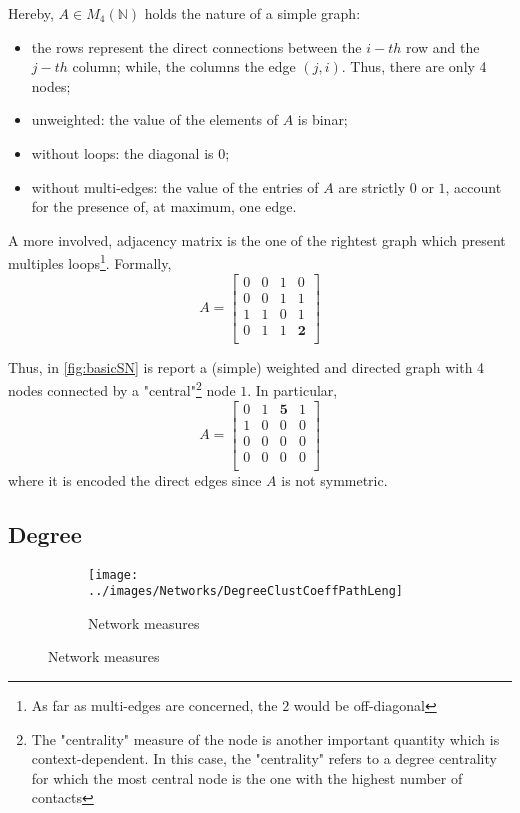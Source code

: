 \documentclass[a4paper,10pt,twoside]{book} %
\theoremstyle{definition}
\begin{document}
Hereby, $A \in M_4(\mathbb{N})$ holds the nature of a simple graph:
\begin{itemize}[noitemsep]
	\item the rows represent the direct connections between the $i-th$ row and the $j-th$ column; while, the columns the edge $(j,i)$. Thus, there are only 4 nodes;
	\item unweighted: the value of the elements of $A$ is binar;
	\item without loops: the diagonal is $0$;
	\item without multi-edges: the value of the entries of $A$ are strictly $0$ or $1$, account for the presence of, at maximum, one edge.
\end{itemize}

A more involved, adjacency matrix is the one of the rightest graph which present multiples loops\footnote{As far as multi-edges are concerned, the $2$ would be off-diagonal}.
Formally,
\[
A = 
\begin{bmatrix}
0 & 0 & 1 & 0 \\
0 & 0 & 1 & 1 \\
1 & 1 & 0 & 1 \\
0 & 1 & 1 & \textbf{2} \\
\end{bmatrix}
\]

Thus, in \autoref{fig:basicSN} is report a (simple) weighted and directed graph with 4 nodes connected by a "central"\footnote{The "centrality" measure of the node is another important quantity which is context-dependent. In this case, the "centrality" refers to a degree centrality for which the most central node is the one with the highest number of contacts} node $1$.
In particular,
\[
A = 
\begin{bmatrix}
0 & 1 & \textbf{5} & 1 \\
1 & 0 & 0 & 0 \\
0 & 0 & 0 & 0 \\
0 & 0 & 0 & 0 \\ 
\end{bmatrix}
\]
where it is encoded the direct edges since $A$ is not symmetric.

\subsection{Degree}

\begin{figure}[ht]
    \begin{subfigure}{\textwidth}
        \texttt{[image: ../images/Networks/DegreeClustCoeffPathLeng]}
        \centering
        \caption{Network measures \cite{Olaf:2011_NonRandomBrain}}
        \label{fig:degree_clustcoefficient_pathlength}
    \end{subfigure}
\end{figure}
\end{document}
